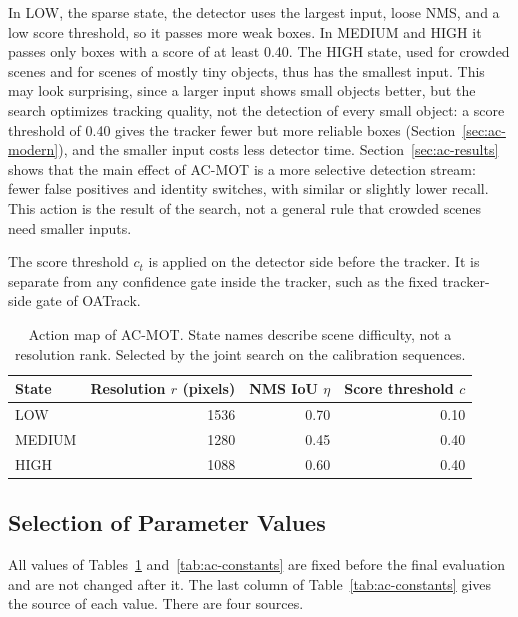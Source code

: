 In LOW, the sparse state, the detector uses the largest input, loose NMS, and a low score threshold, so it passes more weak boxes. In MEDIUM and HIGH it passes only boxes with a score of at least 0.40. The HIGH state, used for crowded scenes and for scenes of mostly tiny objects, thus has the smallest input. This may look surprising, since a larger input shows small objects better, but the search optimizes tracking quality, not the detection of every small object: a score threshold of 0.40 gives the tracker fewer but more reliable boxes (Section~\ref{sec:ac-modern}), and the smaller input costs less detector time. Section~\ref{sec:ac-results} shows that the main effect of AC-MOT is a more selective detection stream: fewer false positives and identity switches, with similar or slightly lower recall. This action is the result of the search, not a general rule that crowded scenes need smaller inputs.

The score threshold $c_t$ is applied on the detector side before the tracker. It is separate from any confidence gate inside the tracker, such as the fixed tracker-side gate of OATrack.

\begin{table}[tbp]
\centering
\caption{Action map of AC-MOT. State names describe scene difficulty, not a resolution rank. Selected by the joint search on the calibration sequences.}
\label{tab:ac-actions}
\begin{tabular}{lrrr}
\toprule
State & Resolution $r$ (pixels) & NMS IoU $\eta$ & Score threshold $c$\\
\midrule
LOW & 1536 & 0.70 & 0.10\\
MEDIUM & 1280 & 0.45 & 0.40\\
HIGH & 1088 & 0.60 & 0.40\\
\bottomrule
\end{tabular}
\end{table}

\subsection{Selection of Parameter Values}\label{sec:ac-constants}
All values of Tables~\ref{tab:ac-actions} and~\ref{tab:ac-constants} are fixed before the final evaluation and are not changed after it. The last column of Table~\ref{tab:ac-constants} gives the source of each value. There are four sources.

